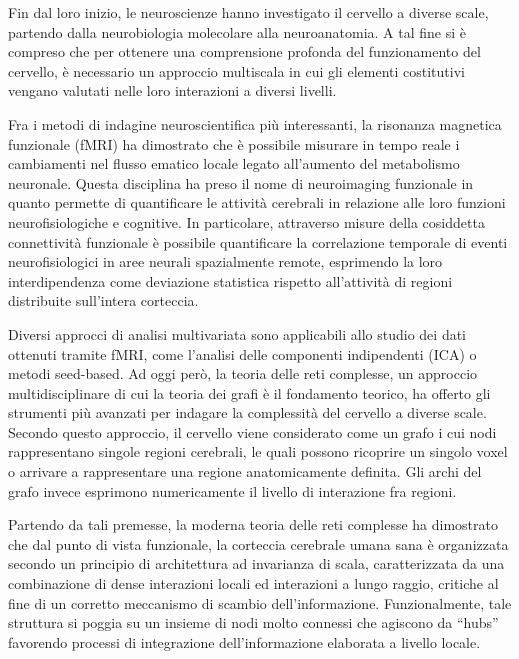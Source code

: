 
Fin dal loro inizio, le neuroscienze hanno investigato il cervello a diverse scale, partendo dalla neurobiologia molecolare alla neuroanatomia.
A tal fine si è compreso che per ottenere una comprensione profonda del funzionamento del cervello, è necessario un approccio multiscala in cui gli elementi costitutivi vengano valutati nelle loro interazioni a diversi livelli.

Fra i metodi di indagine neuroscientifica più interessanti, la risonanza magnetica funzionale (fMRI) ha dimostrato che è possibile misurare in tempo reale i cambiamenti nel flusso ematico locale legato all'aumento del metabolismo neuronale.
Questa disciplina ha preso il nome di neuroimaging funzionale in quanto permette di quantificare le attività cerebrali in relazione alle loro funzioni neurofisiologiche e cognitive.
In particolare, attraverso misure della cosiddetta connettività funzionale è possibile quantificare la correlazione temporale di eventi neurofisiologici in aree neurali spazialmente remote, esprimendo la loro interdipendenza come deviazione statistica rispetto all'attività di regioni distribuite sull'intera corteccia.

Diversi approcci di analisi multivariata sono applicabili allo studio dei dati ottenuti tramite fMRI, come l'analisi delle componenti indipendenti (ICA) o metodi seed-based.
Ad oggi però, la teoria delle reti complesse, un approccio multidisciplinare di cui la teoria dei grafi è il fondamento teorico, ha offerto gli strumenti più avanzati per indagare la complessità del cervello a diverse scale.
Secondo questo approccio, il cervello viene considerato come un grafo i cui nodi rappresentano singole regioni cerebrali, le quali possono ricoprire un singolo voxel o arrivare a rappresentare una regione anatomicamente definita.
Gli archi del grafo invece esprimono numericamente il livello di interazione fra regioni.

Partendo da tali premesse, la moderna teoria delle reti complesse ha dimostrato che dal punto di vista funzionale, la corteccia cerebrale umana sana è organizzata secondo un principio di architettura ad invarianza di scala, caratterizzata da una combinazione di dense interazioni locali ed interazioni a lungo raggio, critiche al fine di un corretto meccanismo di scambio dell'informazione.
Funzionalmente, tale struttura si poggia su un insieme di nodi molto connessi che agiscono da ``hubs'' favorendo processi di integrazione dell'informazione elaborata a livello locale.

